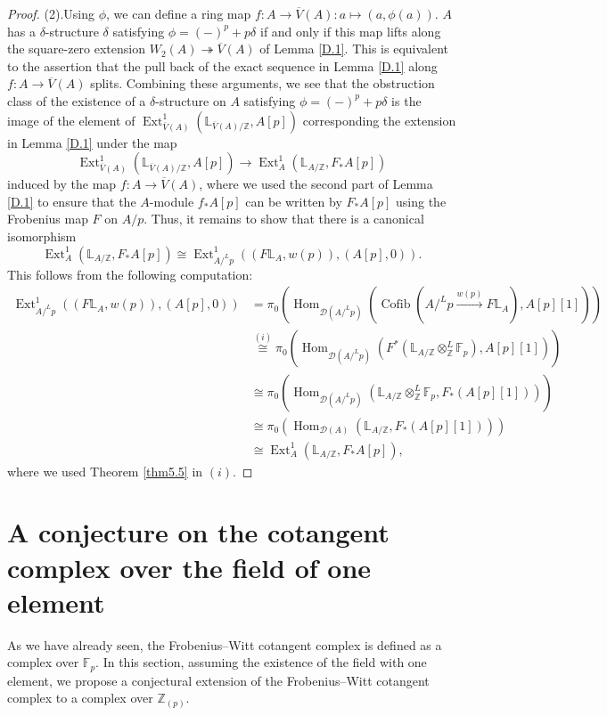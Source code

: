 \documentclass[11pt, a4paper]{amsart}
\theoremstyle{plain}
\theoremstyle{definition}
\begin{document}
\begin{proof}
    (2).Using $\phi$, we can define a ring map $f:A\to \overline V(A):a\mapsto (a,\phi(a))$. $A$ has a $\delta$-structure $\delta$ satisfying $\phi=(-)^p+p\delta$ if and only if this map lifts along the square-zero extension $W_2(A)\twoheadrightarrow \overline V(A)$ of Lemma \ref{D.1}. This is equivalent to the assertion that the pull back of the exact sequence in Lemma \ref{D.1} along $f:A\to \overline V(A)$ splits. Combining these arguments, we see that the obstruction class of the existence of a $\delta$-structure on $A$ satisfying $\phi=(-)^p+p\delta$ is the image of the element of $\operatorname{Ext}^1_{\overline{V}(A)}(\mathbb L_{\overline V(A)/\mathbb Z},A[p])$ corresponding the extension in Lemma \ref{D.1} under the map \[\operatorname{Ext}^1_{\overline{V}(A)}(\mathbb L_{\overline V(A)/\mathbb Z},A[p])\to \operatorname{Ext}^1_A(\mathbb L_{A/\mathbb Z},F_*A[p])\] induced by the map $f:A\to \overline{V}(A)$, where we used the second part of Lemma \ref{D.1} to ensure that the $A$-module $f_*A[p]$ can be written by $F_*A[p]$ using the Frobenius map $F$ on $A/p$. Thus, it remains to show that there is a canonical isomorphism\[\operatorname{Ext}^1_A(\mathbb L_{A/\mathbb Z},F_*A[p])\cong \operatorname{Ext}^1_{A/^Lp}((F\mathbb L_A,w(p)),(A[p],0)).\] This follows from the following computation:\begin{align*}
        \operatorname{Ext}^1_{A/^Lp}((F\mathbb L_A,w(p)),(A[p],0))&=\pi_0(\operatorname{Hom}_{\mathcal D(A/^Lp)}(\operatorname{Cofib}(A/^Lp\xrightarrow[]{w(p)}F\mathbb L_A),A[p][1]))\\&\overset{(i)}{\cong} \pi_0(\operatorname{Hom}_{\mathcal D(A/^Lp)}(F^*(\mathbb L_{A/\mathbb Z}\otimes^L_{\mathbb Z}\mathbb F_p),A[p][1]))\\&\cong \pi_0(\operatorname{Hom}_{\mathcal D(A/^Lp)}(\mathbb L_{A/\mathbb Z}\otimes^L_{\mathbb Z}\mathbb F_p,F_*(A[p][1])))\\&\cong \pi_0(\operatorname{Hom}_{\mathcal D(A)}(\mathbb L_{A/\mathbb Z},F_*(A[p][1])))\\&\cong \operatorname{Ext}^1_A(\mathbb L_{A/\mathbb Z},F_*A[p]),
    \end{align*} where we used Theorem \ref{thm5.5} in $(i)$.
\end{proof}

\section{A conjecture on the cotangent complex over the field of one element}
As we have already seen, the Frobenius--Witt cotangent complex is defined as a complex over $\mathbb F_p$. In this section, assuming the existence of the field with one element, we propose a conjectural extension of the Frobenius--Witt cotangent complex to a complex over $\mathbb Z_{(p)}$.
\end{document}
